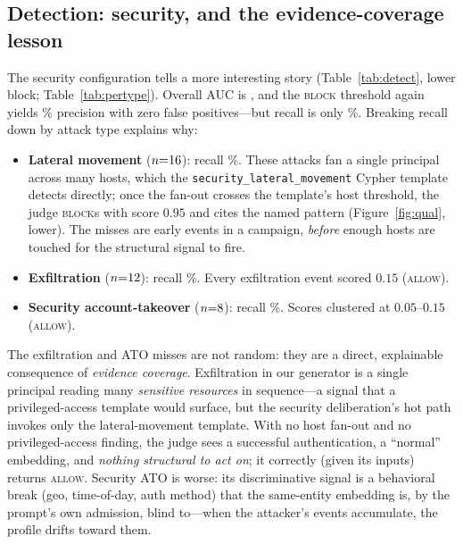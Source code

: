 \documentclass[sigconf,nonacm,screen]{acmart}
\newcommand{\us}{\_\allowbreak}   %
\begin{document}
\subsection{Detection: security, and the evidence-coverage lesson}

The security configuration tells a more interesting story (Table~\ref{tab:detect},
lower block; Table~\ref{tab:pertype}). Overall AUC is \secauc{}, and the
\textsc{block} threshold again yields \secblockprec\% precision with zero false
positives---but recall is only \secblockrec\%. Breaking recall down by attack type
explains why:

\begin{itemize}
  \item \textbf{Lateral movement} ($n{=}16$): recall
        \secreclateralmovement\%. These attacks fan a single principal across many
        hosts, which the \texttt{security\us lateral\us movement} Cypher template
        detects directly; once the fan-out crosses the template's host threshold,
        the judge \textsc{block}s with score $0.95$ and cites the named pattern
        (Figure~\ref{fig:qual}, lower). The misses are early events in a campaign,
        \emph{before} enough hosts are touched for the structural signal to fire.
  \item \textbf{Exfiltration} ($n{=}12$): recall
        \secrecexfiltration\%. Every exfiltration event scored $0.15$
        (\textsc{allow}).
  \item \textbf{Security account-takeover} ($n{=}8$): recall
        \secrecsecurityato\%. Scores clustered at $0.05$--$0.15$ (\textsc{allow}).
\end{itemize}

The exfiltration and ATO misses are not random: they are a direct,
explainable consequence of \emph{evidence coverage}. Exfiltration in our
generator is a single principal reading many \emph{sensitive resources} in
sequence---a signal that a privileged-access template would surface, but the
security deliberation's hot path invokes only the lateral-movement template. With
no host fan-out and no privileged-access finding, the judge sees a successful
authentication, a ``normal'' embedding, and \emph{nothing structural to act on};
it correctly (given its inputs) returns \textsc{allow}. Security ATO is worse:
its discriminative signal is a behavioral break (geo, time-of-day, auth method)
that the same-entity embedding is, by the prompt's own admission, blind
to---when the attacker's events accumulate, the profile drifts toward them.
\end{document}
